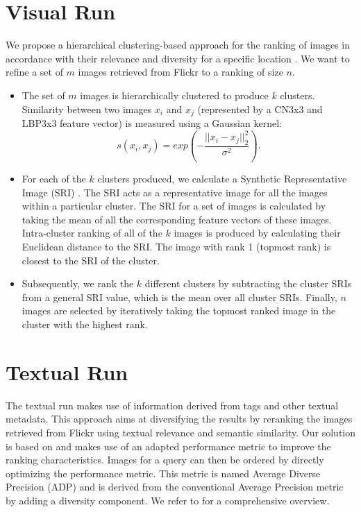 \documentclass{acm_proc_article-me11_tweaked}
\begin{document}
\section{Visual Run}
\label{visual-similarity}
We propose a hierarchical clustering-based approach for the ranking of images in accordance with their relevance and diversity for a specific location \cite{representativeness}. 
We want to refine a set of $m$ images retrieved from Flickr to a ranking of size $n$.
\begin{itemize}
 \item The set of $m$ images is hierarchically clustered to produce $k$ clusters. Similarity between two images $x_i$ and $x_j$ (represented by a CN3x3 and LBP3x3 feature vector) is measured using a Gaussian kernel:
 \begin{equation}
 \label{gaussian-similarity}
s(x_i, x_j) = exp\left(-\frac{||x_i - x_j||_2^2}{\sigma^2}\right).
 \end{equation}
 
 \item For each of the $k$ clusters produced, we calculate a Synthetic Representative Image (SRI) \cite{representativeness}.
The SRI acts as a representative image for all the images within a particular cluster. 
The SRI for a set of images is calculated by taking the mean of all the corresponding feature vectors of these images. 
Intra-cluster ranking of all of the $k$ images is produced by calculating their Euclidean distance to the SRI.
The image with rank 1 (topmost rank) is closest to the SRI of the cluster.
\item Subsequently, we rank the $k$ different clusters by subtracting the cluster SRIs from a general SRI value, which is the mean over all cluster SRIs. 
Finally, $n$ images are selected by iteratively taking the topmost ranked image in the cluster with the highest rank. 
\end{itemize}

\section{Textual Run}
The textual run makes use of information derived from tags and other textual metadata.
This approach aims at diversifying the results by reranking the images retrieved from Flickr using textual relevance and semantic similarity.
Our solution is based on \cite{textual-diversification} and makes use of an adapted performance metric to improve the ranking characteristics.
Images for a query can then be ordered by directly optimizing the performance metric.
This metric is named Average Diverse Precision (ADP) and is derived from the conventional Average Precision metric by adding a diversity component.
We refer to \cite{textual-diversification} for a comprehensive overview.
\end{document}
